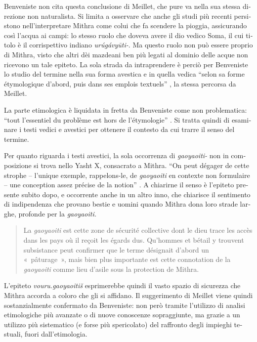 \documentclass[output=paper]{../langscibook}
\begin{document}
\begin{otherlanguage}{italian}
Benveniste non cita questa conclusione di Meillet, che pure va nella sua stessa direzione non naturalista. Si limita a osservare che anche gli studi più recenti persistono nell’interpretare Mithra come colui che fa scendere la pioggia, assicurando così l’acqua ai campi: lo stesso ruolo che doveva avere il dio vedico Soma, il cui titolo è il corrispettivo indiano \textit{urúgávyūti{}-}. Ma questo ruolo non può essere proprio di Mithra, visto che altri dèi mazdeani ben più legati al dominio delle acque non ricevono un tale epiteto. La sola strada da intraprendere è perciò per Benveniste lo studio del termine nella sua forma avestica e in quella vedica “selon sa forme étymologique d'abord, puis dans ses emplois textuels” \citep[278]{benveniste_mithra_2015}, la stessa percorsa da Meillet. 

La parte etimologica è liquidata in fretta da Benveniste come non problematica: “tout l’essentiel du problème est hors de l’étymologie” \citep[278]{benveniste_mithra_2015}. Si tratta quindi di esaminare i testi vedici e avestici per ottenere il contesto da cui trarre il senso del termine.

Per quanto riguarda i testi avestici, la sola occorrenza di \textit{gaoyaoiti-} non in composizione si trova nello Yasht X, consacrato a Mithra. “On peut dégager de cette strophe – l’unique exemple, rappelons-le, de \textit{gaoyaoiti} en contexte non formulaire – une conception assez précise de la notion” \citep[281]{benveniste_mithra_2015}. A chiarirne il senso è l’epiteto presente subito dopo, e occorrente anche in un altro inno, che chiarisce il sentimento di indipendenza che provano bestie e uomini quando Mithra dona loro strade larghe, profonde per la \textit{gaoyaoiti.}

\begin{quote}
    La \textit{gaoyaoiti} est cette zone de sécurité collective dont le dieu trace les accès dans les pays où il reçoit les égards dus. Qu’hommes et bétail y trouvent subsistance peut confirmer que le terme désignait d’abord un «~pâturage~», mais bien plus importante est cette connotation de la \textit{gaoyaoiti} comme lieu d’asile sous la protection de Mithra. \citep[281]{benveniste_mithra_2015}
\end{quote}

L’epiteto \textit{vouru.gaoyaoitiš} esprimerebbe quindi il vasto spazio di sicurezza che Mithra accorda a coloro che gli si affidano. Il suggerimento di Meillet viene quindi sostanzialmente confermato da Benveniste: non però tramite l’utilizzo di analisi etimologiche più avanzate o di nuove conoscenze sopraggiunte, ma grazie a un utilizzo più sistematico (e forse più spericolato) del raffronto degli impieghi testuali, fuori dall’etimologia.


\end{otherlanguage}
\end{document}
